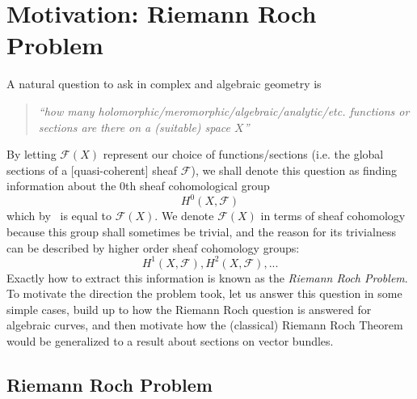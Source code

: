 \documentclass{book}
\newcommand{\CF}{{\mathcal{F}}}
\begin{document}

\chapter{Motivation: Riemann Roch Problem}\label{cha:motivation}


A natural question to ask in complex and algebraic geometry is
\begin{quote}
  \begin{center}
    \emph{``how many holomorphic/meromorphic/algebraic/analytic/etc. functions or sections are there on a (suitable) space
    $X$''}
\end{center}
\end{quote}

By letting $\CF(X)$ represent our choice of functions/sections (i.e. the global sections of a [quasi-coherent]
sheaf $\CF$), we shall denote this question as finding information about the $0$th sheaf cohomological group
\[
  H^0(X, \CF)
\]
which by~\cite{NateAlgGeo} is equal to $\CF(X)$. We denote $\CF(X)$ in terms of sheaf cohomology because this
group shall sometimes be trivial, and the reason for its trivialness can be described by higher order sheaf
cohomology groups:
\[
  H^1(X, \CF), H^2(X, \CF), ...
\]
Exactly how to extract this information is known as the \emph{Riemann Roch Problem}. To motivate the direction
the problem took, let us answer this question in some simple cases, build up to how the Riemann Roch question
is answered for algebraic curves, and then motivate how the (classical) Riemann Roch
Theorem would be generalized to a result about sections on vector bundles.

\section{Riemann Roch Problem}
\end{document}

